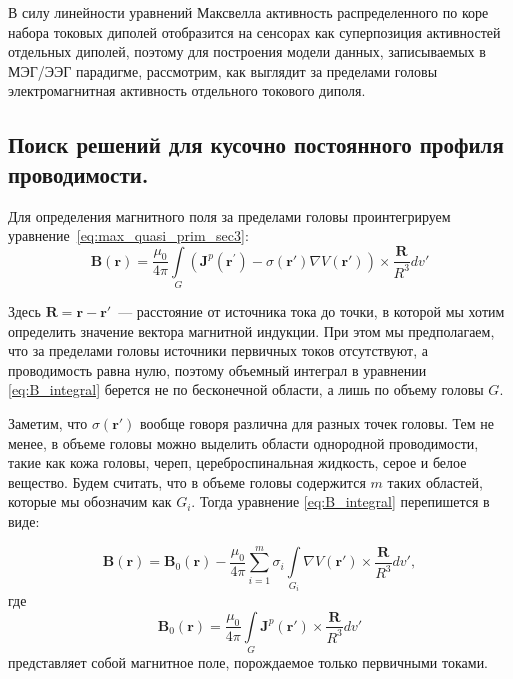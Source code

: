 В силу линейности уравнений Максвелла активность распределенного по коре набора токовых
диполей отобразится на сенсорах как суперпозиция активностей отдельных диполей, поэтому
для построения модели данных, записываемых в МЭГ/ЭЭГ парадигме,
рассмотрим, как выглядит за пределами головы электромагнитная активность отдельного токового диполя.

\subsection{Поиск решений для кусочно постоянного профиля проводимости.}
Для определения магнитного поля за пределами головы проинтегрируем уравнение~\ref{eq:max_quasi_prim_sec3}:
\begin{equation}
    \mathbf{B}(\mathbf{r}) = \frac{\mu_0}{4\pi}\int \limits_{G} (\mathbf{J}^p(\mathbf{r}^\prime) -
    \sigma(\mathbf{r}') \nabla V(\mathbf{r}')) \times \frac{\mathbf{R}}{R^3} dv'
    \label{eq:B_integral}
\end{equation}

Здесь $\mathbf{R} = \mathbf{r} - \mathbf{r}'$~--- расстояние от источника тока до точки,
в которой мы хотим определить значение вектора магнитной индукции.
При этом мы предполагаем, что за пределами головы источники первичных токов отсутствуют,
а проводимость равна нулю, поэтому объемный интеграл в уравнении \ref{eq:B_integral}
берется не по бесконечной области, а лишь по объему головы $G$.

Заметим, что $\sigma(\mathbf{r}')$ вообще говоря различна для разных точек головы.
Тем не менее, в объеме головы можно выделить области однородной проводимости, такие как
кожа головы, череп, цереброспинальная жидкость, серое и белое вещество.
Будем считать, что в объеме головы содержится $m$ таких областей, которые мы обозначим как $G_i$.
Тогда уравнение \ref{eq:B_integral} перепишется в виде:

\begin{equation}
    \mathbf{B}(\mathbf{r}) = \mathbf{B}_0(\mathbf{r}) -
\frac{\mu_0}{4\pi}\sum_{i=1}^{m}\sigma_i \int \limits_{G_i} \nabla V(\mathbf{r}')
\times \frac{\mathbf{R}}{R^3} dv',
    \label{eq:B_integral_1}
\end{equation}
где
\begin{equation}
    \mathbf{B}_0(\mathbf{r}) =
    \frac{\mu_0}{4\pi}\int \limits_{G} \mathbf{J}^p(\mathbf{r}') \times \frac{\mathbf{R}}{R^3} dv'
    \label{eq:B_0_def}
\end{equation}
представляет собой магнитное поле, порождаемое только первичными токами.

